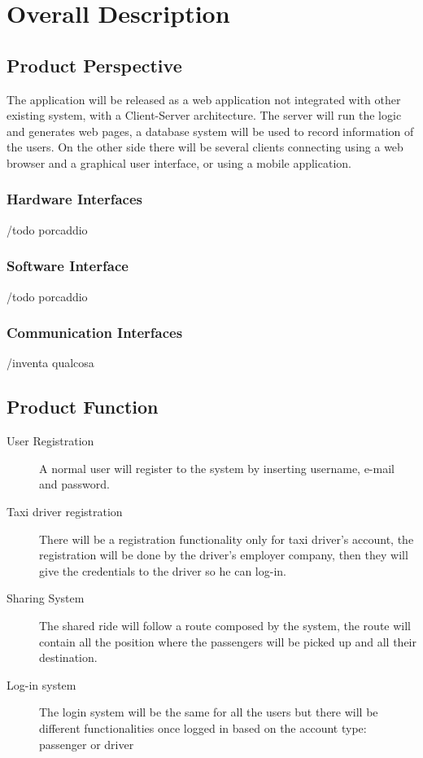\section{Overall Description}

\subsection{Product Perspective}
	The application will be released as a web application not integrated with other existing system, with a Client-Server architecture. The server will run the logic and generates web pages, a database system will be used to record information of the users. On the other side there will be several clients connecting using a web browser and a graphical user interface, or using a mobile application.	
	
	\subsubsection{Hardware Interfaces}
	/todo porcaddio
	\subsubsection{Software Interface}
	/todo porcaddio
	\subsubsection{Communication Interfaces}
	/inventa qualcosa
		
\subsection{Product Function}
	\begin{description}
		\item [User Registration] A normal user will register to the system by inserting username, e-mail and password.
		\item [Taxi driver registration] There will be a registration functionality only for taxi driver's account, the registration will be done by the driver's employer company, then they will give the credentials to the driver so he can log-in.
		\item [Sharing System] The shared ride will follow a route composed by the system, the route will contain all the position where the passengers will be picked up and all their destination.
		\item [Log-in system] The login system will be the same for all the users but there will be different functionalities once logged in based on the account type: passenger or driver
	\end{description}
	
